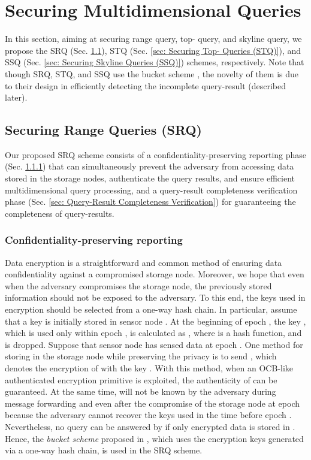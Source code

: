 \documentclass[conference]{IEEEtran}
\begin{document}
\section{Securing Multidimensional Queries}\label{sec: Securing Multidimensional Queries}
In this section, aiming at securing range query, top- query, and skyline query, we propose the SRQ (Sec. \ref{sec: Securing Range Queries (SRQ)}), STQ (Sec. \ref{sec: Securing Top- Queries (STQ)}), and SSQ (Sec. \ref{sec: Securing Skyline Queries (SSQ)}) schemes, respectively. Note that though SRQ, STQ, and SSQ use the bucket scheme \cite{hilm02,hmt04}, the novelty of them is due to their design in efficiently detecting the incomplete query-result (described later).

\subsection{Securing Range Queries (SRQ)}\label{sec: Securing Range Queries (SRQ)}
Our proposed SRQ scheme consists of a confidentiality-preserving reporting phase (Sec. \ref{sec: Confidentiality-preserving reporting}) that can simultaneously prevent the adversary from accessing data stored in the storage nodes, authenticate the query results, and ensure efficient multidimensional query processing, and a query-result completeness verification phase (Sec. \ref{sec: Query-Result Completeness Verification}) for guaranteeing the completeness of query-results.

\subsubsection{Confidentiality-preserving reporting}\label{sec: Confidentiality-preserving reporting}
Data encryption is a straightforward and common method of ensuring data confidentiality against a compromised storage node. Moreover, we hope that even when the adversary compromises the storage node, the previously stored information should not be exposed to the adversary. To this end, the keys used in encryption should be selected from a one-way hash chain. In particular, assume that a key  is initially stored in sensor node . At the beginning of epoch , the key , which is used only within epoch , is calculated as , where  is a hash function, and  is dropped. Suppose that sensor node  has sensed data  at epoch . One method for storing  in the storage node  while preserving the privacy is to send , which denotes the encryption of  with the key . With this method, when an OCB-like authenticated encryption primitive \cite{rbb03} is exploited, the authenticity of  can be guaranteed. At the same time,  will not be known by the adversary during message forwarding and even after the compromise of the storage node at epoch  because the adversary cannot recover the keys used in the time before epoch . Nevertheless, no query can be answered by  if only encrypted data is stored in . Hence, the \emph{bucket scheme} proposed in \cite{hilm02,hmt04}, which uses the encryption keys generated via a one-way hash chain, is used in the SRQ scheme.
\end{document}
